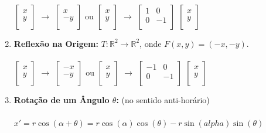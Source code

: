 \documentclass[oneside,a4paper,12pt]{article}
\begin{document}
\begin{enumerate}
	\\
	$\left[
	\begin{array}{c}
	x\\
	y \\
	\end{array}
	\right]$ $\rightarrow$ $ \left[
	\begin{array}{c}
	x\\
	-y \\
	\end{array}
	\right]$
	ou 
	$\left[
	\begin{array}{c}
	x\\
	y \\
	\end{array}
	\right]$ $\rightarrow$
	$\left[
	\begin{array}{cc}
	1	&	0\\
	0	&	-1 \\
	\end{array}
	\right]$
	$\left[
	\begin{array}{c}
	x\\
	y \\
	\end{array}
	\right]$
	\item {\bf Reflexão na Origem:} $T:\mathbb{R}^2 \rightarrow \mathbb{R}^2$, onde $F(x,y) = (-x,-y)$. 
	\\ \vspace{150pt}
	\\
	$\left[
	\begin{array}{c}
	x\\
	y \\
	\end{array}
	\right]$ $\rightarrow$ $ \left[
	\begin{array}{c}
	-x\\
	-y \\
	\end{array}
	\right]$
	ou 
	$\left[
	\begin{array}{c}
	x\\
	y \\
	\end{array}
	\right]$ $\rightarrow$
	$\left[
	\begin{array}{cc}
	-1	&	0\\
	0	&	-1 \\
	\end{array}
	\right]$
	$\left[
	\begin{array}{c}
	x\\
	y \\
	\end{array}
	\right]$
	\item {\bf Rotação de um Ângulo $\theta$:} (no sentido anti-horário)
	\\ \vspace{150pt}
	\\ $x' = r \cos(\alpha + \theta) = r \cos(\alpha) \cos(\theta) - r \sin(alpha) \sin(\theta)$
	

\end{enumerate}
\end{document}
